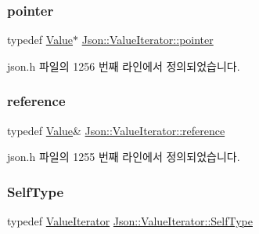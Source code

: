 \mbox{\label{class_json_1_1_value_iterator_acec45feb1ef1f3bf81240157d06d5432}} 
\subsubsection{\texorpdfstring{pointer}{pointer}}
{\footnotesize\ttfamily typedef \hyperlink{class_json_1_1_value}{Value}$\ast$ \hyperlink{class_json_1_1_value_iterator_acec45feb1ef1f3bf81240157d06d5432}{Json\+::\+Value\+Iterator\+::pointer}}



json.\+h 파일의 1256 번째 라인에서 정의되었습니다.

\mbox{\label{class_json_1_1_value_iterator_ae87929b4567aa00372cf602c43b57160}} 
\subsubsection{\texorpdfstring{reference}{reference}}
{\footnotesize\ttfamily typedef \hyperlink{class_json_1_1_value}{Value}\& \hyperlink{class_json_1_1_value_iterator_ae87929b4567aa00372cf602c43b57160}{Json\+::\+Value\+Iterator\+::reference}}



json.\+h 파일의 1255 번째 라인에서 정의되었습니다.

\mbox{\label{class_json_1_1_value_iterator_a23357670fdad61792670d86f62db7e16}} 
\subsubsection{\texorpdfstring{Self\+Type}{SelfType}}
{\footnotesize\ttfamily typedef \hyperlink{class_json_1_1_value_iterator}{Value\+Iterator} \hyperlink{class_json_1_1_value_iterator_a23357670fdad61792670d86f62db7e16}{Json\+::\+Value\+Iterator\+::\+Self\+Type}}



